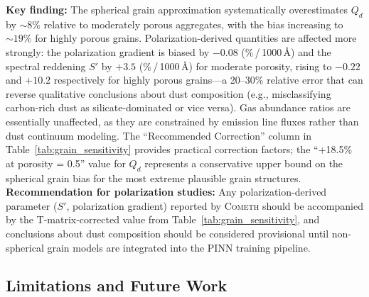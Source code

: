 \documentclass[usenatbib]{mnras}
\begin{document}
\textbf{Key finding:} The spherical grain approximation systematically overestimates $Q_d$ by $\sim 8\%$ relative to moderately porous aggregates, with the bias increasing to $\sim 19\%$ for highly porous grains. Polarization-derived quantities are affected more strongly: the polarization gradient is biased by $-0.08$ (\%\,/\,1000\,\AA) and the spectral reddening $S'$ by $+3.5$ (\%\,/\,1000\,\AA) for moderate porosity, rising to $-0.22$ and $+10.2$ respectively for highly porous grains---a 20--30\% relative error that can reverse qualitative conclusions about dust composition (e.g., misclassifying carbon-rich dust as silicate-dominated or vice versa). Gas abundance ratios are essentially unaffected, as they are constrained by emission line fluxes rather than dust continuum modeling. The ``Recommended Correction'' column in Table~\ref{tab:grain_sensitivity} provides practical correction factors; the ``+18.5\% at porosity = 0.5'' value for $Q_d$ represents a conservative upper bound on the spherical grain bias for the most extreme plausible grain structures. \textbf{Recommendation for polarization studies:} Any polarization-derived parameter ($S'$, polarization gradient) reported by \textsc{Cometh} should be accompanied by the T-matrix-corrected value from Table~\ref{tab:grain_sensitivity}, and conclusions about dust composition should be considered provisional until non-spherical grain models are integrated into the PINN training pipeline.

\subsection{Limitations and Future Work}\label{sec:limitations}
\end{document}
